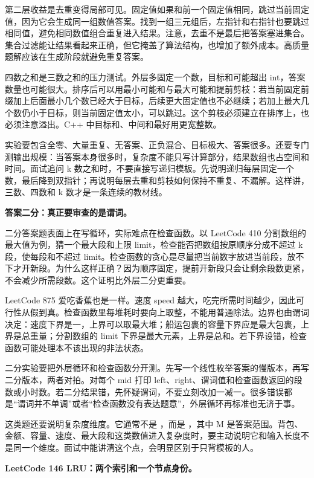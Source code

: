 第二层收益是去重变得局部可见。固定值如果和前一个固定值相同，跳过当前固定值，因为它会生成同一组数值答案。找到一组三元组后，左指针和右指针也要跳过相同值，避免相同数值组合重复进入结果。注意，去重不是最后把答案塞进集合。集合过滤能让结果看起来正确，但它掩盖了算法结构，也增加了额外成本。高质量题解应该在生成阶段就避免重复答案。

四数之和是三数之和的压力测试。外层多固定一个数，目标和可能超出 int，答案数量也可能很大。排序后可以用最小可能和与最大可能和提前剪枝：若当前固定前缀加上后面最小几个数已经大于目标，后续更大固定值也不必继续；若加上最大几个数仍小于目标，则当前固定值太小，可以跳过。这个剪枝必须建立在排序上，也必须注意溢出。C++ 中目标和、中间和最好用更宽整数。

实验要包含全零、大量重复、无答案、正负混合、目标极大、答案很多。还要专门测输出规模：当答案本身很多时，复杂度不能只写计算部分，结果数组也占空间和时间。面试追问 k 数之和时，不要直接写递归模板。先说明递归每层固定一个数，最后降到双指针；再说明每层去重和剪枝如何保持不重复、不漏解。这样讲，三数、四数和 k 数才是一条连续的教材线。

\noindent\textbf{答案二分：真正要审查的是谓词。}

二分答案题表面上在写循环，实际难点在检查函数。以 LeetCode 410 分割数组的最大值为例，猜一个最大段和上限 limit，检查能否把数组按原顺序分成不超过 k 段，使每段和不超过 limit。检查函数的贪心是尽量把当前数字放进当前段，放不下才开新段。为什么这样正确？因为顺序固定，提前开新段只会让剩余段数更紧，不会减少所需段数。这个证明比外层二分更重要。

LeetCode 875 爱吃香蕉也是一样。速度 speed 越大，吃完所需时间越少，因此可行性从假到真。检查函数里每堆耗时要向上取整，不能用普通除法。边界也由谓词决定：速度下界是一，上界可以取最大堆；船运包裹的容量下界应是最大包裹，上界是总重量；分割数组的 limit 下界是最大元素，上界是总和。若下界设错，检查函数可能处理本不该出现的非法状态。

二分实验要把外层循环和检查函数分开测。先写一个线性枚举答案的慢版本，再写二分版本，两者对拍。对每个 mid 打印 left、right、谓词值和检查函数返回的段数或小时数。若二分结果错，先怀疑谓词，不要立刻改加一减一。很多错误都是“谓词并不单调”或者“检查函数没有表达题意”，外层循环再标准也无济于事。

这类题还要说明复杂度维度。它通常不是 ，而是 ，其中 M 是答案范围。背包、金额、容量、速度、最大段和这类数值进入复杂度时，要主动说明它和输入长度不是同一个维度。面试中能讲清这个点，会明显区别于只背模板的人。

\noindent\textbf{LeetCode 146 LRU：两个索引和一个节点身份。}

